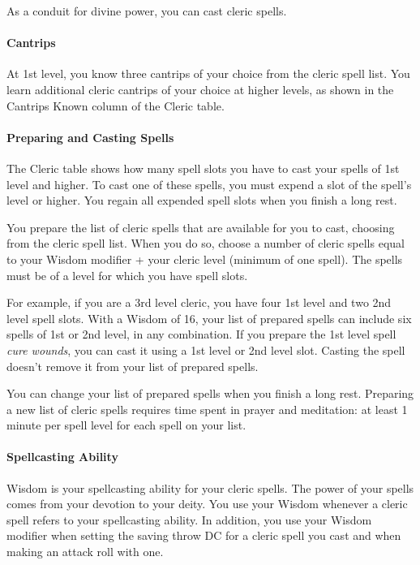 \documentclass[
]{article}
\begin{document}
As a conduit for divine power, you can cast cleric spells.

\hypertarget{cantrips}{%
\paragraph{Cantrips}\label{cantrips}}

At 1st level, you know three cantrips of your choice from the cleric
spell list. You learn additional cleric cantrips of your choice at
higher levels, as shown in the Cantrips Known column of the Cleric
table.

\hypertarget{preparing-and-casting-spells}{%
\paragraph{Preparing and Casting
Spells}\label{preparing-and-casting-spells}}

The Cleric table shows how many spell slots you have to cast your spells
of 1st level and higher. To cast one of these spells, you must expend a
slot of the spell's level or higher. You regain all expended spell slots
when you finish a long rest.

You prepare the list of cleric spells that are available for you to
cast, choosing from the cleric spell list. When you do so, choose a
number of cleric spells equal to your Wisdom modifier + your cleric
level (minimum of one spell). The spells must be of a level for which
you have spell slots.

For example, if you are a 3rd level cleric, you have four 1st level and
two 2nd level spell slots. With a Wisdom of 16, your list of prepared
spells can include six spells of 1st or 2nd level, in any combination.
If you prepare the 1st level spell \emph{cure wounds}, you can cast it
using a 1st level or 2nd level slot. Casting the spell doesn't remove it
from your list of prepared spells.

You can change your list of prepared spells when you finish a long rest.
Preparing a new list of cleric spells requires time spent in prayer and
meditation: at least 1 minute per spell level for each spell on your
list.

\hypertarget{spellcasting-ability}{%
\paragraph{Spellcasting Ability}\label{spellcasting-ability}}

Wisdom is your spellcasting ability for your cleric spells. The power of
your spells comes from your devotion to your deity. You use your Wisdom
whenever a cleric spell refers to your spellcasting ability. In
addition, you use your Wisdom modifier when setting the saving throw DC
for a cleric spell you cast and when making an attack roll with one.
\end{document}
